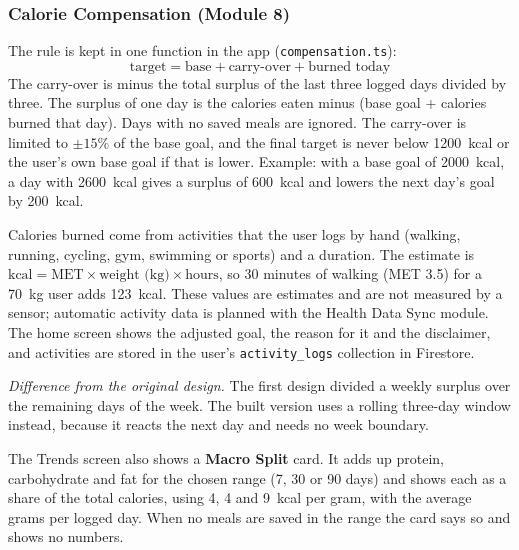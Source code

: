 \subsubsection{Calorie Compensation (Module 8)}
The rule is kept in one function in the app (\texttt{compensation.ts}):
\[
\text{target} = \text{base} + \text{carry-over} + \text{burned today}
\]
The carry-over is minus the total surplus of the last three logged days divided by
three. The surplus of one day is the calories eaten minus (base goal + calories
burned that day). Days with no saved meals are ignored. The carry-over is limited
to $\pm 15\%$ of the base goal, and the final target is never below 1200~kcal or
the user's own base goal if that is lower. Example: with a base goal of 2000~kcal, a
day with 2600~kcal gives a surplus of 600~kcal and lowers the next day's goal by
200~kcal.

Calories burned come from activities that the user logs by hand (walking, running,
cycling, gym, swimming or sports) and a duration. The estimate is
$\text{kcal} = \text{MET} \times \text{weight (kg)} \times \text{hours}$, so 30 minutes
of walking (MET 3.5) for a 70~kg user adds 123~kcal. These values are estimates and
are not measured by a sensor; automatic activity data is planned with the Health
Data Sync module. The home screen shows the adjusted goal, the reason for it and the
disclaimer, and activities are stored in the user's \texttt{activity\_logs} collection
in Firestore.

\textit{Difference from the original design.} The first design divided a weekly
surplus over the remaining days of the week. The built version uses a rolling three-day
window instead, because it reacts the next day and needs no week boundary.


The Trends screen also shows a \textbf{Macro Split} card. It adds up protein, carbohydrate
and fat for the chosen range (7, 30 or 90 days) and shows each as a share of the total
calories, using 4, 4 and 9~kcal per gram, with the average grams per logged day. When
no meals are saved in the range the card says so and shows no numbers.


